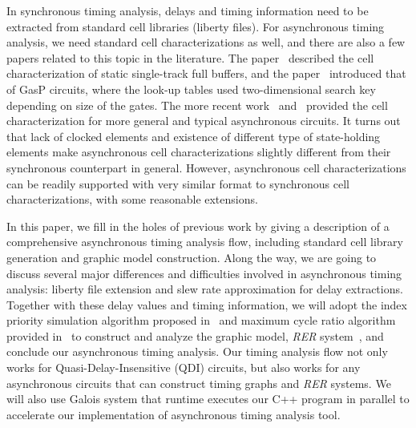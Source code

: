 \documentclass[sigconf, 10pt, twocolumn]{acmart}
\begin{document}
In synchronous timing analysis, delays and timing information need to be extracted from standard cell libraries (liberty files). For asynchronous timing analysis, we need standard cell characterizations as well, and there are also a few papers related to this topic in the literature. The paper~\cite{Prakash:Library} described the cell characterization of static single-track full buffers, and the paper~\cite{Gilla:Library} introduced that of GasP circuits, where the look-up tables used two-dimensional search key depending on size of the gates. The more recent work~\cite{Moreira:LiChEn} and~\cite{Moreira:Automated} provided the cell characterization for more general and typical asynchronous circuits. It turns out that lack of clocked elements and existence of different type of state-holding elements make asynchronous cell characterizations slightly different from their synchronous counterpart in general. However, asynchronous cell characterizations can be readily supported with very similar format to synchronous cell characterizations, with some reasonable extensions.



In this paper, we fill in the holes of previous work by giving a description of a comprehensive asynchronous timing analysis flow, including standard cell library generation and graphic model construction. Along the way, we are going to discuss several major differences and difficulties involved in asynchronous timing analysis: liberty file extension and slew rate approximation for delay extractions. Together with these delay values and timing information, we will adopt the index priority simulation algorithm proposed in~\cite{Lee:Analysis} and maximum cycle ratio algorithm provided in~\cite{Karp:Parametric,Neal:Faster} to construct and analyze the graphic model, {\it RER\/} system~\cite{Burns:Peformance}, and conclude our asynchronous timing analysis. Our timing analysis flow not only works for Quasi-Delay-Insensitive (QDI) circuits, but also works for any asynchronous circuits that can construct timing graphs and {\it RER\/} systems. We will also use Galois system that runtime executes our C++ program in parallel to accelerate our implementation of asynchronous timing analysis tool.


\end{document}

